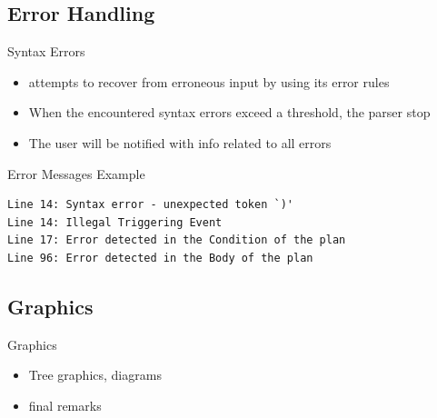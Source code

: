 \subsection{Error Handling}
\begin{frame}[fragile]{Syntax Errors}
  \begin{itemize}
    \item {} attempts to recover from erroneous input 
    by using its error rules
\n
    \item When the encountered syntax errors exceed a threshold, 
    the parser stop
\n
    \item The user will be notified with info related to all errors
    
  \end{itemize}
\N
  \begin{exampleblock}{Error Messages Example}
\begin{verbatim}
Line 14: Syntax error - unexpected token `)'
Line 14: Illegal Triggering Event
Line 17: Error detected in the Condition of the plan
Line 96: Error detected in the Body of the plan
\end{verbatim}
  \end{exampleblock}
%
\N\N
\end{frame}


\subsection{Graphics}
\begin{frame}{Graphics}
  \begin{itemize}
    \item Tree graphics, diagrams
\N
    \item final remarks
% 
  \end{itemize}
%
\N\N
\end{frame}







% 


